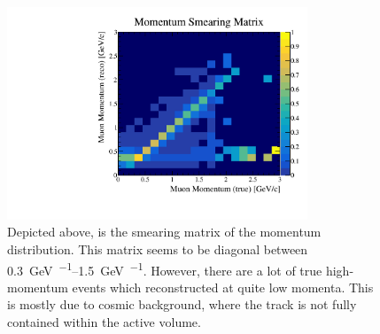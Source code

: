 \begin{figure}[htbp]
    \centering
    \includegraphics[width=0.8\textwidth]{images/FirstCCInclusive/Smearing/SmearingMatrixMomentum.pdf}
    \caption[Smearing Matrices of the Momentum Distribution]{Depicted above, is the smearing matrix of the momentum distribution. This matrix seems to be diagonal between \SIrange[per-mode = symbol]{0.3}{1.5}{\giga\electronvolt\per\lightspeed}. However, there are a lot of true high-momentum events which reconstructed at quite low momenta. This is mostly due to cosmic background, where the track is not fully contained within the active volume.}
    \label{fig:SmearingMatrixMomentum}
\end{figure}

